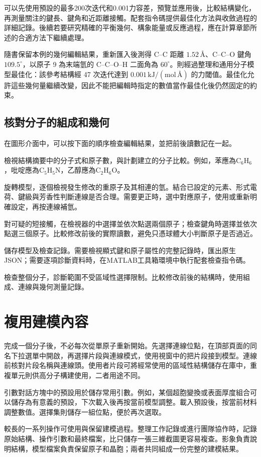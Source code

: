 可以先使用預設的最多200次迭代和0.001力容差，預覽並應用後，比較結構變化，再測量關注的鍵長、鍵角和近距離接觸。配套指令碼提供最佳化方法與收斂過程的詳細記錄。後續若要研究精確的平衡幾何、構象能量或反應過程，應在計算章節所述的合適方法下繼續處理。

隨書保留本例的幾何編輯結果，重新匯入後測得 C--C 距離 $1.52\,\text{\AA}$、C--C--O 鍵角 $109.5^\circ$，以原子 9 為末端氫的 C--C--O--H 二面角為 $60^\circ$。\mbox{}則經過整理和通用分子模型最佳化：該參考結構經 47 次迭代達到 $0.001\,\mathrm{kJ/(mol\,\text{\AA})}$ 的力閾值。最佳化允許這些幾何量繼續改變，因此不能把編輯時指定的數值當作最佳化後仍然固定的約束。

\subsection{核對分子的組成和幾何}\label{sec:molecule-manual-check}

在圖形介面中，可以按下面的順序檢查編輯結果，並把前後讀數記在一起。

\begin{steps}
  \item 檢視結構摘要中的分子式和原子數，與計劃建立的分子比較。例如，苯應為$\mathrm{C_6H_6}$，吡啶應為$\mathrm{C_5H_5N}$，乙醇應為$\mathrm{C_2H_6O}$。
  \item 旋轉模型，逐個檢視發生修改的重原子及其相連的氫。結合已設定的元素、形式電荷、鍵級與芳香性判斷連線是否合理。需要更正時，選中對應原子，使用或重新明確設定，再按連線補氫。
  \item 對可疑的短接觸，在檢視器的中選擇並依次點選兩個原子；檢查鍵角時選擇並依次點選三個原子。比較修改前後的實際讀數，避免只憑球體大小判斷原子是否過近。
  \item 儲存模型及檢查記錄。需要檢視顯式鍵和原子屬性的完整記錄時，匯出原生JSON；需要逐項診斷資料時，在MATLAB\regmark{}工具箱環境中執行配套檢查指令碼。
\end{steps}

檢查整個分子，診斷範圍不受區域性選擇限制。比較修改前後的結構時，使用組成、連線與幾何測量記錄。

\section{複用建模內容}

完成一個分子後，不必每次從單原子重新開始。先選擇連線位點，在頂部頁面的同名下拉選單中開啟，再選擇片段與連線模式，使用視窗中的把片段接到模型。連線前核對片段名稱與連線頭。使用者片段可將經常使用的區域性結構儲存在庫中，重複單元則供高分子構建使用，二者用途不同。

引數對話方塊中的預設用於儲存常用引數。例如，某個超胞變換或表面厚度組合可以儲存為有意義的預設，下次載入後再按當前模型調整。載入預設後，按當前材料調整數值。選擇集則儲存一組位點，便於再次選取。

較長的一系列操作可使用與保留建模過程。整理工作記錄或進行團隊協作時，記錄原始結構、操作引數和最終檔案，比只儲存一張三維截圖更容易複查。影象負責說明結構，模型檔案負責保留原子和晶胞；兩者共同組成一份完整的建模結果。
